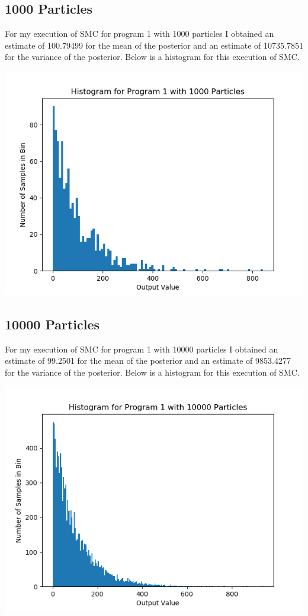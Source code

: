 \documentclass[11pt]{article}
\theoremstyle{definition}
\begin{document}
\subsection{1000 Particles}


For my execution of SMC for program 1 with 1000 particles I obtained an estimate of 100.79499 for the mean of the posterior and an estimate of 10735.7851 for the variance of the posterior. Below is a histogram for this execution of SMC.

\begin{center}
\includegraphics[scale=0.5]{../plots/P1NP1000.png}
\end{center}

\subsection{10000 Particles}

For my execution of SMC for program 1 with 10000 particles I obtained an estimate of 99.2501 for the mean of the posterior and an estimate of 9853.4277 for the variance of the posterior. Below is a histogram for this execution of SMC.

\begin{center}
\includegraphics[scale=0.5]{../plots/P1NP10000.png}
\end{center}
\end{document}
